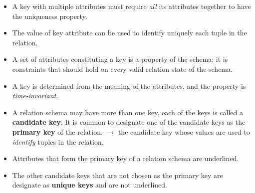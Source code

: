 \documentclass[10pt]{article}
\begin{document}
\begin{enumerate}
\begin{itemize}
\begin{itemize}
			\item A key with multiple attributes must require \textit{all} its attributes together to have the uniqueness property.
			\item The value of key attribute can be used to identify uniquely each tuple in the relation.
			\item A set of attributes constituting a key is a property of the schema; it is constraints that should hold on every valid relation state of the schema.
			\item A key is determined from the meaning of the attributes, and the property is \textit{time-invariant}.
			\item A relation schema may have more than one key, each of the keys is called a \textbf{candidate key}. It is common to designate one of the candidate keys as the \textbf{primary key} of the relation. $\rightarrow$ the candidate key whose values are used to \textit{identify} tuples in the relation.
			\item Attributes that form the primary key of a relation schema are underlined.
			\item The other candidate keys that are not chosen as the primary key are designate as \textbf{unique keys} and are not underlined. 
		\end{itemize}
			
	\end{itemize}


\end{enumerate}
\end{document}
